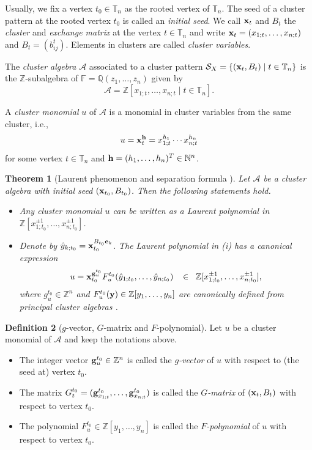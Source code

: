 \documentclass[10pt]{amsart}
\newtheorem{theorem}{Theorem}[section]
\theoremstyle{definition}
\newtheorem{definition}[theorem]{Definition}
\theoremstyle{remark}
\numberwithin{equation}{section}
\begin{document}
Usually, we fix a vertex $t_0\in\mathbb T_n$ as the rooted vertex of $\mathbb T_n$. The seed of a cluster pattern at the rooted vertex $t_0$ is called an {\em initial seed}. We call
${\bf x}_t$ and $B_t$ the {\em cluster} and {\em exchange matrix} at the vertex $t\in\mathbb T_n$ and write
 ${\bf x}_t=(x_{1;t},\ldots,x_{n;t})$ and $B_t=(b_{ij}^t)$. Elements in clusters are called {\em cluster variables}. 

The {\em cluster algebra} $\mathcal A$ associated to a cluster pattern $\mathcal S_X=\{({\bf x}_t, B_t)\mid t\in \mathbb T_n\}$ is the $\mathbb Z$-subalgebra of $\mathbb F=\mathbb Q(z_1,\ldots,z_n)$ given by
 $$\mathcal A=\mathbb Z[x_{1;t},\ldots,x_{n;t}\mid t\in\mathbb T_n].$$

 A {\em cluster monomial} $u$ of $\mathcal A$ is a monomial in cluster variables from the same cluster, i.e., $$u={\bf x}_t^{\bf h}=x_{1;t}^{h_1}\cdots x_{n;t}^{h_n}$$ for some vertex $t\in\mathbb T_n$ and ${\bf h}=(h_1,\ldots,h_n)^T\in\mathbb N^n$.
\begin{theorem}[Laurent phenomenon and separation formula
\cite{fz_2002,fomin_zelevinsky_2007}]
Let $\mathcal A$ be a cluster algebra with initial seed
$({\bf x}_{t_0}, B_{t_0})$. Then the following statements hold.

\begin{itemize}
    \item [(i)] Any cluster monomial $u$ can be written as a Laurent polynomial in  $\mathbb Z[x_{1;t_0}^{\pm 1},\ldots,x_{n;t_0}^{\pm 1}]$.
    \item [(ii)]  Denote by   $\hat y_{k;t_0}={\bf x}_{t_0}^{B_{t_0}{\bf e}_k}$. The Laurent polynomial in (i) has a canonical expression
\begin{eqnarray}\label{eqn:x-gF}
   u={\bf x}_{t_0}^{{\bf g}_{u}^{t_0}}F_{u}^{t_0}(\hat y_{1;t_0},\ldots,\hat y_{n;t_0})\;\;\;\in\;\; \mathbb Z[x_{1;t_0}^{\pm 1},\ldots,x_{n;t_0}^{\pm 1}],\nonumber
\end{eqnarray}
where $g_{u}^{t_0}\in\mathbb Z^n$ and $F_{u}^{t_0}({\bf y})\in\mathbb Z[y_1,\ldots,y_n]$ are canonically defined from principal cluster algebras \cite[(6.4) \& (3.3)]{fomin_zelevinsky_2007}.
\end{itemize}
\end{theorem}



\begin{definition}[$g$-vector, $G$-matrix and $F$-polynomial] Let $u$ be a cluster monomial of $\mathcal A$ and keep the notations above.
\begin{itemize}
\item [(i)] The integer vector ${\bf g}_{u}^{t_0}\in\mathbb Z^n$ is called the {\em $g$-vector} of $u$ with respect to (the seed at) vertex $t_0$. 
\item [(ii)]The  matrix 
    $G_t^{t_0}=({\bf g}_{x_{1;t}}^{t_0},\ldots,{\bf g}_{x_{n;t}}^{t_0})$ 
    is called the {\em $G$-matrix} of $({\bf x}_t, B_t)$ with respect to vertex $t_0$.
\item [(iii)] The polynomial $F_{u}^{t_0}\in\mathbb Z[y_1,\ldots,y_n]$ is called the {\em $F$-polynomial} of $u$ with respect to  vertex $t_0$.
\end{itemize}
\end{definition}
\end{document}
